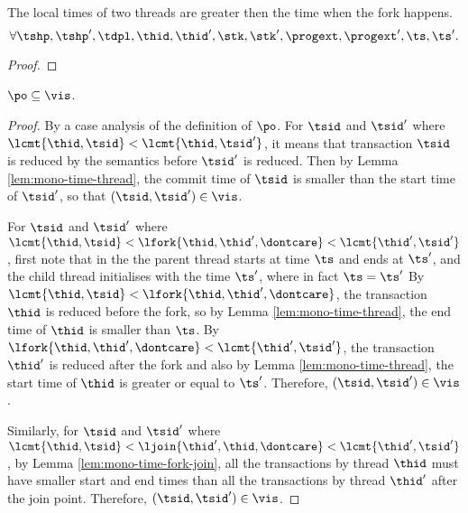 \begin{lem}
    \label{lem:mono-time-fork-join}
    The local times of two threads are greater then the time when the fork happens.
    \[
        \forall \tshp, \tshp', \tdpl, \thid, \thid', \stk, \stk', \progext, {\progext}', \ts, \ts' \ldotp
    \]
\end{lem}
\begin{proof}
\end{proof}

\begin{lem}[Session]
    \label{lem:session}
    \( \po \subseteq \vis \).
\end{lem}   
\begin{proof}
    By a case analysis of the definition of \( \po \).
    For \( \tsid \) and \( \tsid' \) where \( \lcmt{\thid,\tsid} < \lcmt{\thid,\tsid'} \), it means that transaction \( \tsid \) is reduced by the semantics before \( \tsid' \) is reduced.
    Then by Lemma \ref{lem:mono-time-thread}, the commit time of \( \tsid \) is smaller than the start time of \( \tsid' \), so that \( (\tsid, \tsid') \in \vis \).

    For \( \tsid \) and \( \tsid' \) where \( \lcmt{\thid,\tsid} < \lfork{\thid,\thid', \dontcare} < \lcmt{\thid',\tsid'} \), first note that in the  the parent thread starts at time \( \ts \) and ends at \( \ts' \), and the child thread initialises with the time \( \ts' \), where  in fact \( \ts = \ts' \)
    By \( \lcmt{\thid,\tsid} < \lfork{\thid,\thid', \dontcare}  \), the transaction \( \thid \) is reduced before the fork, so by Lemma \ref{lem:mono-time-thread}, the end time of \( \thid \) is smaller than \( \ts \).
    By \( \lfork{\thid,\thid', \dontcare} < \lcmt{\thid',\tsid'} \), the transaction \( \thid' \) is reduced after the fork and also by Lemma \ref{lem:mono-time-thread}, the start time of \( \thid \) is greater or equal to \( \ts' \).
    Therefore, \( (\tsid, \tsid') \in \vis \).

    Similarly, for \( \tsid \) and \( \tsid' \) where \( \lcmt{\thid,\tsid} < \ljoin{\thid',\thid, \dontcare} < \lcmt{\thid',\tsid'} \), by Lemma \ref{lem:mono-time-fork-join}, all the transactions by thread \( \thid \) must have smaller start and end times than all the transactions by thread \( \thid' \) after the join point.
    Therefore, \( (\tsid, \tsid') \in \vis \).
\end{proof}


